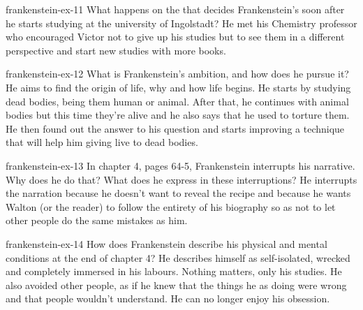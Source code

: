 \documentclass[preview]{standalone}
\begin{document}
\begin{snippetexercise}{frankenstein-ex-11}
    {What happens on the  that decides Frankenstein's 
    soon after he starts studying at the university of Ingolstadt?}
    He met his Chemistry professor who encouraged Victor not to give up his studies
    but to see them in a different perspective and start new studies
    with more books.
\end{snippetexercise}

\begin{snippetexercise}{frankenstein-ex-12}
    {What is Frankenstein's ambition, and how does he pursue it?}
    He aims to find the origin of life, why and how life begins.
    He starts by studying dead bodies, being them human or animal.
    After that, he continues with animal bodies but this time they're alive and he also says that he
    used to torture them.
    He then found out the answer to his question and starts improving a technique that will help
    him giving live to dead bodies.
\end{snippetexercise}

\begin{snippetexercise}{frankenstein-ex-13}
    {In chapter 4, pages 64-5, Frankenstein interrupts his narrative. Why does he do that? What does
    he express in these interruptions?}
    He interrupts the narration because he doesn't want to reveal the recipe
    and because he wants Walton (or the reader) to follow the entirety
    of his biography so as not to let other people do the same mistakes as him.
\end{snippetexercise}

\begin{snippetexercise}{frankenstein-ex-14}
    {How does Frankenstein describe his physical and mental conditions at the end of chapter 4?}
    He describes himself as self-isolated, wrecked and completely immersed
    in his labours. Nothing matters, only his studies. He also
    avoided other people, as if he knew that the things he as doing
    were wrong and that people wouldn't understand.
    He can no longer enjoy his obsession.
\end{snippetexercise}
\end{document}
